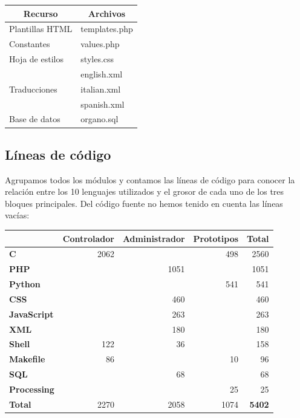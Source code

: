 \begin{center}
	\begin{tabular}{|l|l|}
		\hline \multicolumn{1}{|c|}{\textbf{Recurso}} & \multicolumn{1}{c|}{\textbf{Archivos}}  \\ 
		\hline Plantillas HTML & templates.php \\
		\hline Constantes & values.php \\
		\hline Hoja de estilos & styles.css \\
		\hline \multirow{3}{*}{Traducciones} & english.xml \\
		& italian.xml \\
		& spanish.xml \\
		\hline Base de datos & organo.sql \\
		\hline 
	\end{tabular}
	\smallskip
\end{center}

\smallskip

\subsection{Líneas de código}

Agrupamos todos los módulos y contamos las líneas de código para conocer la relación entre los 10 lenguajes utilizados y el grosor de cada uno de los tres bloques principales. Del código fuente no hemos tenido en cuenta las líneas vacías:

\smallskip

\begin{center}
	\begin{tabular}{|l|r|r|r|r|}
		\hline & \textbf{Controlador} & \textbf{Administrador} & \textbf{Prototipos} & \textbf{Total} \\ 
		\hline \textbf{C} & 2062 & & 498 & 2560 \\
		\hline \textbf{PHP} & & 1051 & & 1051 \\
		\hline \textbf{Python} &  &  & 541 & 541 \\
		\hline \textbf{CSS} & & 460 & & 460 \\
		\hline \textbf{JavaScript} & & 263 & & 263 \\
		\hline \textbf{XML} & & 180 & & 180 \\
		\hline \textbf{Shell} & 122 & 36 & & 158 \\
		\hline \textbf{Makefile} & 86 &  & 10 & 96 \\
		\hline \textbf{SQL} & & 68 & & 68 \\
		\hline \textbf{Processing} & & & 25 & 25 \\
		\hline \textbf{Total} & 2270 & 2058 & 1074 & \textbf{5402} \\
		\hline 
	\end{tabular}
	\smallskip
\end{center}

